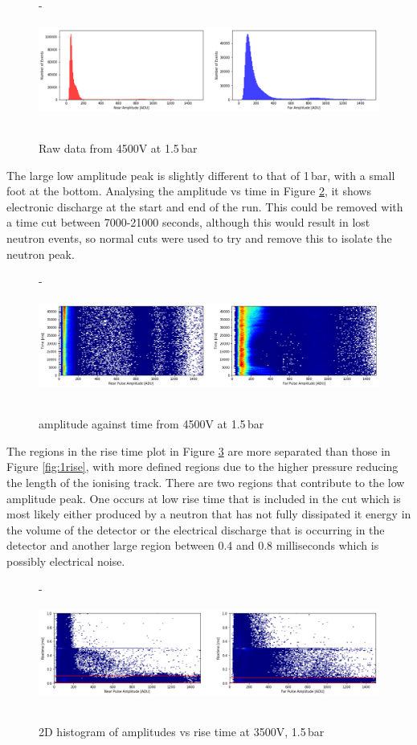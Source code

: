 \documentclass[a4paper]{article}
\begin{document}
\begin{figure}[H]- 
    \centering
    \includegraphics[height=3.7cm]{plots/uk24n002_ampbefore.png}
    \caption{Raw data from 4500V at 1.5\,bar}
    \label{fig:2bef}
\end{figure}
\noindent The large low amplitude peak is slightly different to that of 1\,bar, with a small foot at the bottom. Analysing the amplitude vs time in Figure \ref{fig:2tim}, it shows electronic discharge at the start and end of the run. This could be removed with a time cut between 7000-21000 seconds, although this would result in lost neutron events, so normal cuts were used to try and remove this to isolate the neutron peak.
\begin{figure}[H]- 
    \centering
    \includegraphics[height=3.7cm]{plots/uk24n002_time.png}
    \caption{amplitude against time from 4500V at 1.5\,bar}
    \label{fig:2tim}
\end{figure}
\noindent The regions in the rise time plot in Figure \ref{fig:2rise} are more separated than those in Figure \ref{fig:1rise}, with more defined regions due to the higher pressure reducing the length of the ionising track. There are two regions that contribute to the low amplitude peak. One occurs at low rise time that is included in the cut which is most likely either produced by a neutron that has not fully dissipated it energy in the volume of the detector or the electrical discharge that is occurring in the detector and another large region between 0.4 and 0.8 milliseconds which is possibly electrical noise.
\begin{figure}[H]-
\centering
\includegraphics[height=3.7cm]{plots/uk24n002_rise.png}
\caption{2D histogram of amplitudes vs rise time at 3500V, 1.5\,bar}
\label{fig:2rise}
\end{figure}
\end{document}
